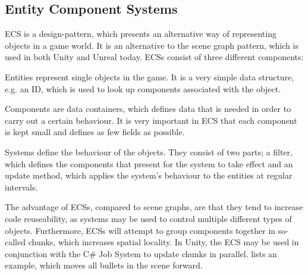 \subsection{Entity Component Systems}
\gls{ECS} is a design-pattern, which presents an alternative way of representing objects in a game world. It is an alternative to the scene graph pattern\cite{scene:graph}, which is used in both Unity and Unreal today. \glspl{ECS} consist of three different components\cite{unity:ecs,ecs:general}:
\begin{labeling}{\quad\quad}
    \item[Entities] represent single objects in the game. It is a very simple data structure, e.g. an ID, which is used to look up components associated with the object.
    \item[Components] are data containers, which defines data that is needed in order to carry out a certain behaviour. It is very important in \gls{ECS} that each component is kept small and defines as few fields as possible.
    \item[Systems] define the behaviour of the objects. They consist of two parts; a filter, which defines the components that present for the system to take effect and an update method, which applies the system's behaviour to the entities at regular intervals.
\end{labeling}

The advantage of \glspl{ECS}, compared to scene graphs, are that they tend to increase code reuseability, as systems may be used to control multiple different types of objects. Furthermore, \glspl{ECS} will attempt to group components together in so-called chunks, which increases spatial locality. In Unity, the \gls{ECS} may be used in conjunction with the C\# Job System to update chunks in parallel\cite{unity:ecs}.  lists an example, which moves all bullets in the scene forward.

